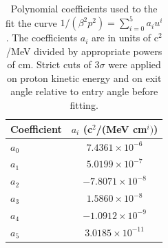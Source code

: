 \documentclass[11pt,a4paper]{article}
\begin{document}
\begin{table}[h]
\centering
\caption{Polynomial coefficients used to the fit the curve $1/(\beta^2 p^2) = \sum_{i=0}^5 a_i u^i$. The coefficients $a_{i}$ are in units of c$^2$/MeV divided by appropriate powers of cm. Strict cuts of $3\sigma$ were applied on proton kinetic energy and on exit angle relative to entry angle before fitting.}
\begin{tabular}{l|c}
\hline
Coefficient & $a_{i}$ (c$^2$/(MeV cm$^{i})$) \\ \hline
$a_0$ & $7.4361\times 10^{-6}$ \\
$a_1$ & $5.0199\times 10^{-7}$ \\
$a_2$ & $-7.8071 \times 10^{-8}$ \\ 
$a_3$ & $1.5860 \times 10^{-8}$ \\
$a_4$ & $-1.0912 \times 10^{-9}$ \\
$a_5$ & $3.0185 \times 10^{-11}$  \\
\end{tabular} 

\label{coefficients}
\end{table}
\end{document}
